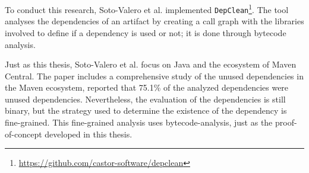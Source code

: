 To conduct this research, Soto-Valero et al. implemented \texttt{DepClean}\footnote{\href{https://github.com/castor-software/depclean}{https://github.com/castor-software/depclean}}. The tool analyses the dependencies of an artifact by creating a call graph with the libraries involved to define if a dependency is used or not; it is done through bytecode analysis.

Just as this thesis, Soto-Valero et al. focus on Java and the ecosystem of Maven Central. The paper includes a comprehensive study of the unused dependencies in the Maven ecosystem, reported that 75.1\% of the analyzed dependencies were unused dependencies. Nevertheless, the evaluation of the dependencies is still binary, but the strategy used to determine the existence of the dependency is fine-grained. This fine-grained analysis uses bytecode-analysis, just as the proof-of-concept developed in this thesis.
